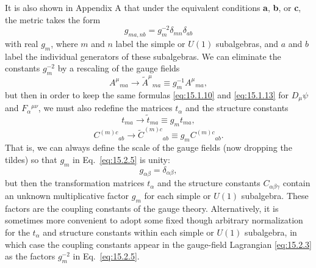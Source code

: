 It is also shown in Appendix A that under the equivalent conditions \textbf{a},
\textbf{b}, or \textbf{c}, the metric takes the form
\begin{equation}
 g_{ma,nb}=g_m^{-2}\delta_{mn}\delta_{ab}
 \tag{15.2.5}\label{eq:15.2.5}
\end{equation}
with real $g_m$, where $m$ and $n$ label the simple or $U(1)$ subalgebras, and
$a$ and $b$ label the individual generators of these subalgebras. We can
eliminate the constants $g_m^{-2}$ by a rescaling of the gauge fields
\begin{equation}
 A^\mu{}_{ma}\longrightarrow\widetilde A^\mu{}_{ma}
 \equiv g_m^{-1}A^\mu{}_{ma} ,
 \tag{15.2.6}\label{eq:15.2.6}
\end{equation}
but then in order to keep the same formulas \eqref{eq:15.1.10} and
\eqref{eq:15.1.13} for $D_\mu\psi$ and $F_\alpha{}^{\mu\nu}$, we must also
redefine the matrices $t_\alpha$ and the structure constants
\begin{equation}
 t_{ma}\longrightarrow\widetilde t_{ma}\equiv g_m t_{ma} ,
 \tag{15.2.7}\label{eq:15.2.7}
\end{equation}
\begin{equation}
 C^{(m)c}{}_{ab}\longrightarrow\widetilde C^{(m)c}{}_{ab}
 \equiv g_m C^{(m)c}{}_{ab} .
 \tag{15.2.8}\label{eq:15.2.8}
\end{equation}
That is, we can always define the scale of the gauge fields (now dropping the
tildes) so that $g_m$ in Eq.~\eqref{eq:15.2.5} is unity:
\begin{equation}
 g_{\alpha\beta}=\delta_{\alpha\beta} ,
 \tag{15.2.9}\label{eq:15.2.9}
\end{equation}
but then the transformation matrices $t_\alpha$ and the structure constants
$C_{\alpha\beta\gamma}$ contain an unknown multiplicative factor $g_m$ for each
simple or $U(1)$ subalgebra. These factors are the coupling constants of the gauge
theory. Alternatively, it is sometimes more convenient to adopt some fixed though
arbitrary normalization for the $t_\alpha$ and structure constants within each
simple or $U(1)$ subalgebra, in which case the coupling constants appear in the
gauge-field Lagrangian \eqref{eq:15.2.3} as the factors $g_m^{-2}$ in
Eq.~\eqref{eq:15.2.5}.
